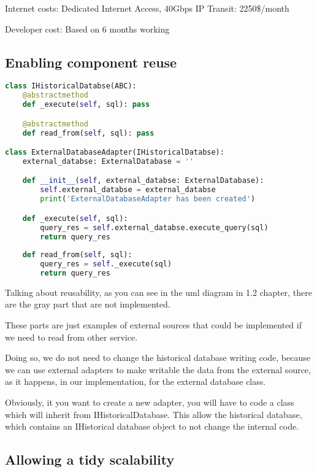 Internet costs:  Dedicated Internet Access, 40Gbps IP Transit: 2250\$/month

Developer cost:  Based on 6 months working\\

\subsection{Enabling component reuse}

\begin{lstlisting}[language=Python]
class IHistoricalDatabse(ABC):
    @abstractmethod
    def _execute(self, sql): pass

    @abstractmethod
    def read_from(self, sql): pass

class ExternalDatabaseAdapter(IHistoricalDatabse):
    external_databse: ExternalDatabase = ''

    def __init__(self, external_databse: ExternalDatabase):
        self.external_databse = external_databse
        print('ExternalDatabaseAdapter has been created')

    def _execute(self, sql):
        query_res = self.external_databse.execute_query(sql)
        return query_res
    
    def read_from(self, sql):
        query_res = self._execute(sql) 
        return query_res   
\end{lstlisting}

Talking about reusability, as you can see in the uml diagram in 1.2 chapter, there are the gray part that are not implemented. 

These parts are just examples of external sources that could be implemented if we need to read from other service. 

Doing so, we do not need to change the historical database writing code, because we can use external adapters to make writable the data from the external source, as it happens, in our implementation, for the external database class.

Obviously, it you want to create a new adapter, you will have to code a class which will inherit from IHistoricalDatabase. This allow the historical database, which contains an IHistorical database object to not change the internal code.

\subsection{Allowing a tidy scalability}

